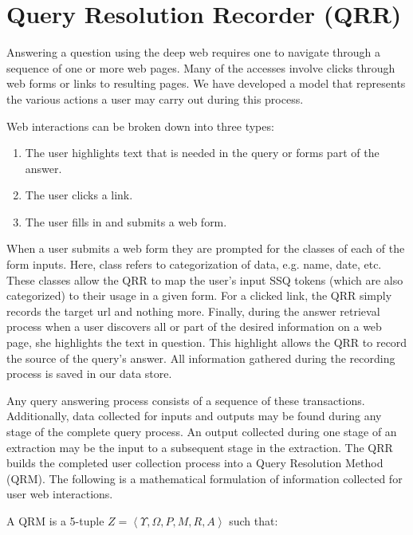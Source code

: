 \section{Query Resolution Recorder (QRR)}
\label{sec:qrr}
Answering a question using the deep web requires one to navigate
through a sequence of one or more web pages. Many of the accesses involve clicks through web forms or links to resulting pages.  We have developed a model that represents the various actions a user may carry out during this process.

Web interactions can be broken down into three types:
\begin{enumerate}
\item The user highlights text that is needed in the query or forms part of the answer.
\item The user clicks a link.
\item The user fills in and submits a web form. 
\end{enumerate}

When a user submits a web form they are prompted for the classes of each of the form inputs. Here, class refers to categorization of data, e.g. name, date, etc. These classes allow the QRR to map the user's input SSQ tokens (which are also categorized) to their usage in a given form. For a clicked link, the QRR simply records the target url and nothing more. Finally, during the answer retrieval process when a user discovers all or part of the desired information on a web page, she highlights the text in question. This highlight allows the QRR to record the source of the query's answer. All information gathered during the recording process is saved in our data store. 

Any query answering process consists of a sequence of these transactions.
Additionally, data collected for inputs and outputs may be found
during any stage of the complete query process.  An output
collected during one stage of an extraction may be the input to a
subsequent stage in the extraction. The QRR builds the completed user
collection process into a Query Resolution Method (QRM).  The following is a mathematical formulation of information collected for user web interactions.

A QRM is a 5-tuple $Z = \left< \Upsilon, \Omega, P, M, R, A \right>$ such that:

